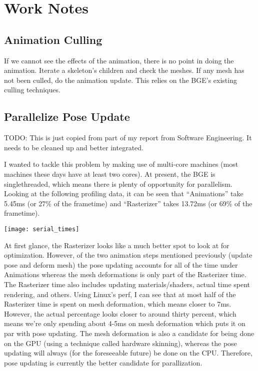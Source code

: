\documentclass[10pt]{article}
\newcommand{\todo}[1] {{\color{todo} TODO: #1}}
\begin{document}
\section{Work Notes}
\subsection{Animation Culling}
If we cannot see the effects of the animation, there is no point in doing the animation. Iterate a skeleton's children and check the meshes. If any mesh has not been culled, do the animation update. This relies on the BGE's existing culling techniques.

\subsection{Parallelize Pose Update}
\todo{This is just copied from part of my report from Software Engineering. It needs to be cleaned up and better integrated.}

I wanted to tackle this problem by making use of multi-core machines (most machines these days have at least two cores). At present, the BGE is singlethreaded, which means there is plenty of opportunity for parallelism. Looking at the following profiling data, it can be seen that ``Animations'' take 5.45ms (or 27\% of the frametime) and ``Rasterizer'' takes 13.72ms (or 69\% of the frametime).

\medskip
\begin{center}
\texttt{[image: serial\_times]}
\end{center}

At first glance, the Rasterizer looks like a much better spot to look at for optimization. However, of the two animation steps mentioned previously (update pose and deform mesh) the pose updating accounts for all of the time under Animations whereas the mesh deformations is only part of the Rasterizer time. The Rasterizer time also includes updating materials/shaders, actual time spent rendering, and others. Using Linux's perf, I can see that at most half of the Rasterizer time is spent on mesh deformation, which means closer to 7ms. However, the actual percentage looks closer to around thirty percent, which means we're only spending about 4-5ms on mesh deformation which puts it on par with pose updating. The mesh deformation is also a candidate for being done on the GPU (using a technique called hardware skinning), whereas the pose updating will always (for the foreseeable future) be done on the CPU. Therefore, pose updating is currently the better candidate for parallization.
\end{document}
